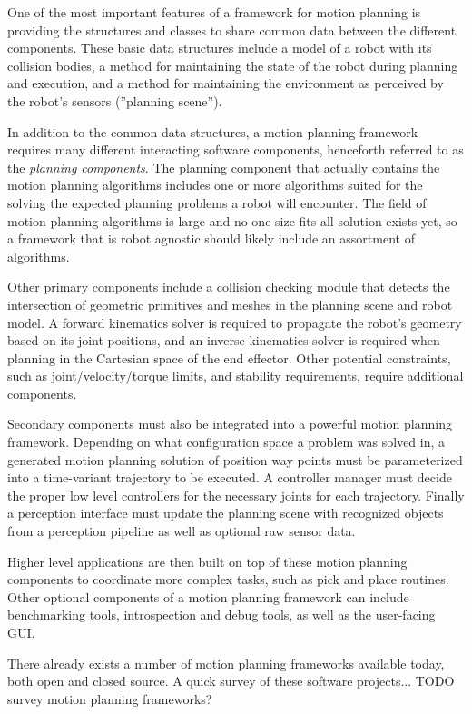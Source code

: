 \documentclass[10pt,journal,compsoc]{joser1}
\begin{document}
{One of the most important features of a framework for motion planning is providing the structures and classes to share common data between the different components. These basic data structures include a model of a robot with its collision bodies, a method for maintaining the state of the robot during planning and execution, and a method for maintaining the environment as perceived by the robot's sensors (''planning scene'').

In addition to the common data structures, a motion planning framework requires many different interacting software components, henceforth referred to as the \textit{planning components}. The planning component that actually contains the motion planning algorithms includes one or more algorithms suited for the solving the expected planning problems a robot will encounter. The field of motion planning algorithms is large and no one-size fits all solution exists yet, so a framework that is robot agnostic should likely include an assortment of algorithms.

Other primary components include a collision checking module that detects the intersection of geometric primitives and meshes in the planning scene and robot model. A forward kinematics solver is required to propagate the robot's geometry based on its joint positions, and an inverse kinematics solver is required when planning in the Cartesian space of the end effector. Other potential constraints, such as joint/velocity/torque limits, and stability requirements, require additional components.

Secondary components must also be integrated into a powerful motion planning framework. Depending on what configuration space a problem was solved in, a generated motion planning solution of position way points must be parameterized into a time-variant trajectory to be executed. A controller manager must decide the proper low level controllers for the necessary joints for each trajectory. Finally a perception interface must update the planning scene with recognized objects from a perception pipeline as well as optional raw sensor data.

Higher level applications are then built on top of these motion planning components to coordinate more complex tasks, such as pick and place routines. Other optional components of a motion planning framework can include benchmarking tools, introspection and debug tools, as well as the user-facing GUI.

There already exists a number of motion planning frameworks available today, both open and closed source. A quick survey of these software projects... TODO survey motion planning frameworks?

}
\end{document}

